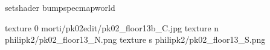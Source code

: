 setshader bumpspecmapworld

texture 0 morti/pk02edit/pk02_floor13b_C.jpg
texture n philipk2/pk02_floor13_N.png
texture s philipk2/pk02_floor13_S.png

